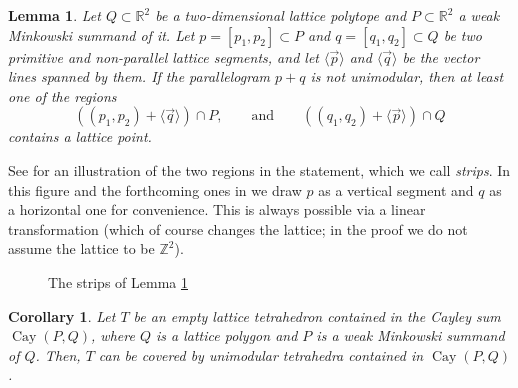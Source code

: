 \documentclass{amsart}
\theoremstyle{plain}
\newtheorem{lemma}[theorem]{Lemma}
\newtheorem{corollary}[theorem]{Corollary}
\theoremstyle{definition}
\newcommand{\Z}{ \ensuremath{\mathbb{Z}}}
\newcommand{\R}{ \ensuremath{\mathbb{R}}}
\renewcommand{\vec}[1]{\overrightarrow#1}
\newcommand{\vecline}[1]{\langle \vec #1 \rangle}
\newcommand{\cayley}{\operatorname{Cay}}
\begin{document}
\begin{lemma}
\label{lemma:cayley}
Let $Q\subset \R^2$ be a two-dimensional lattice polytope and $P\subset \R^2$ a weak Minkowski summand of it. 
Let $p=[p_1,p_2] \subset P$ and $q=[q_1,q_2]\subset Q$ be two primitive and non-parallel lattice segments, and let $\vecline p$ and $ \vecline q$ be the vector lines spanned by them.  If the parallelogram $p + q$ is not unimodular, then at least one of the regions
\[
((p_1, p_2) + \vecline q ) \cap P, 
\qquad \text{and} \qquad
((q_1, q_2) + \vecline p ) \cap Q
\]
contains a lattice point. 
\end{lemma}

See  for an illustration of the two regions in the statement, which we call \emph{strips}. In this figure and the forthcoming ones in  
we draw $p$ as a vertical segment and $q$ as a horizontal one for convenience. This is always possible via a linear transformation (which of course changes the lattice; in the proof we do not assume the lattice to be $\Z^2$). 


\begin{figure}[htb]
\scalebox{.75}{}
\caption{The strips  of Lemma \ref{lemma:cayley}}
\label{fig:strips}
\end{figure}

\begin{corollary}
\label{coro:covercayley}
Let $T$ be an empty lattice tetrahedron contained in the Cayley sum $\cayley(P,Q)$, where $Q$ is a lattice polygon and $P$ is a weak Minkowski summand of $Q$. Then, $T$ can be covered by unimodular tetrahedra contained in $\cayley(P,Q)$.
\end{corollary}
\end{document}
